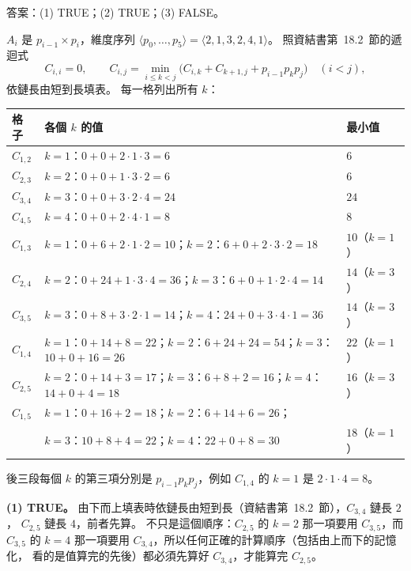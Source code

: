 \begin{pastsoln}
答案：(1) TRUE；(2) TRUE；(3) FALSE。

$A_i$ 是 $p_{i-1} \times p_i$，維度序列 $\langle p_0, \ldots, p_5 \rangle = \langle 2, 1, 3, 2, 4, 1 \rangle$。
照資結書第~18.2~節的遞迴式
\[
C_{i,i} = 0, \qquad
C_{i,j} = \min_{i \le k < j} \bigl( C_{i,k} + C_{k+1,j} + p_{i-1} p_k p_j \bigr) \quad (i < j),
\]
依鏈長由短到長填表。 每一格列出所有 $k$：

\begin{center}
\small
\begin{tabular}{lll}
\toprule
格子 & 各個 $k$ 的值 & 最小值 \\
\midrule
$C_{1,2}$ & $k{=}1$：$0 + 0 + 2 \cdot 1 \cdot 3 = 6$ & $6$ \\
$C_{2,3}$ & $k{=}2$：$0 + 0 + 1 \cdot 3 \cdot 2 = 6$ & $6$ \\
$C_{3,4}$ & $k{=}3$：$0 + 0 + 3 \cdot 2 \cdot 4 = 24$ & $24$ \\
$C_{4,5}$ & $k{=}4$：$0 + 0 + 2 \cdot 4 \cdot 1 = 8$ & $8$ \\
\midrule
$C_{1,3}$ & $k{=}1$：$0 + 6 + 2 \cdot 1 \cdot 2 = 10$；$k{=}2$：$6 + 0 + 2 \cdot 3 \cdot 2 = 18$ & $10$（$k{=}1$） \\
$C_{2,4}$ & $k{=}2$：$0 + 24 + 1 \cdot 3 \cdot 4 = 36$；$k{=}3$：$6 + 0 + 1 \cdot 2 \cdot 4 = 14$ & $14$（$k{=}3$） \\
$C_{3,5}$ & $k{=}3$：$0 + 8 + 3 \cdot 2 \cdot 1 = 14$；$k{=}4$：$24 + 0 + 3 \cdot 4 \cdot 1 = 36$ & $14$（$k{=}3$） \\
\midrule
$C_{1,4}$ & $k{=}1$：$0 + 14 + 8 = 22$；$k{=}2$：$6 + 24 + 24 = 54$；$k{=}3$：$10 + 0 + 16 = 26$ & $22$（$k{=}1$） \\
$C_{2,5}$ & $k{=}2$：$0 + 14 + 3 = 17$；$k{=}3$：$6 + 8 + 2 = 16$；$k{=}4$：$14 + 0 + 4 = 18$ & $16$（$k{=}3$） \\
\midrule
$C_{1,5}$ & $k{=}1$：$0 + 16 + 2 = 18$；$k{=}2$：$6 + 14 + 6 = 26$； & \\
 & $k{=}3$：$10 + 8 + 4 = 22$；$k{=}4$：$22 + 0 + 8 = 30$ & $18$（$k{=}1$） \\
\bottomrule
\end{tabular}
\end{center}
後三段每個 $k$ 的第三項分別是 $p_{i-1} p_k p_j$，例如 $C_{1,4}$ 的 $k = 1$ 是 $2 \cdot 1 \cdot 4 = 8$。

\textbf{(1) TRUE。} 由下而上填表時依鏈長由短到長（資結書第~18.2~節），$C_{3,4}$ 鏈長 $2$，
$C_{2,5}$ 鏈長 $4$，前者先算。 不只是這個順序：$C_{2,5}$ 的 $k = 2$ 那一項要用 $C_{3,5}$，而
$C_{3,5}$ 的 $k = 4$ 那一項要用 $C_{3,4}$，所以任何正確的計算順序（包括由上而下的記憶化，
看的是值算完的先後）都必須先算好 $C_{3,4}$，才能算完 $C_{2,5}$。


\end{pastsoln}
